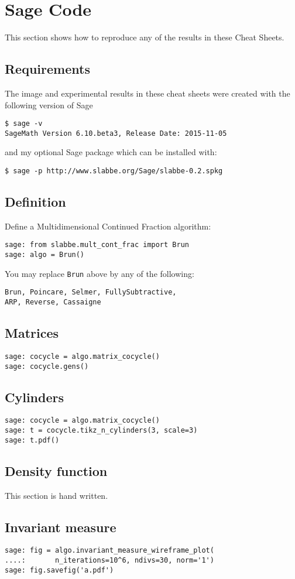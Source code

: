 \section{Sage Code}
This section shows how to reproduce any of the results in these Cheat Sheets.
\subsection{Requirements}
The image and experimental results in these cheat sheets were created with the
following version of Sage \cite{sage}
\begin{verbatim}
$ sage -v
SageMath Version 6.10.beta3, Release Date: 2015-11-05
\end{verbatim}
and my optional Sage package which can be installed with:
\begin{verbatim}
$ sage -p http://www.slabbe.org/Sage/slabbe-0.2.spkg
\end{verbatim}
\subsection{Definition}
Define a Multidimensional Continued Fraction algorithm:
\begin{verbatim}
sage: from slabbe.mult_cont_frac import Brun
sage: algo = Brun()
\end{verbatim}
You may replace \texttt{Brun} above by any of the following:
\begin{verbatim}
Brun, Poincare, Selmer, FullySubtractive, 
ARP, Reverse, Cassaigne
\end{verbatim}
\subsection{Matrices}
\begin{verbatim}
sage: cocycle = algo.matrix_cocycle()
sage: cocycle.gens()
\end{verbatim}
\subsection{Cylinders}
\begin{verbatim}
sage: cocycle = algo.matrix_cocycle()
sage: t = cocycle.tikz_n_cylinders(3, scale=3)
sage: t.pdf()
\end{verbatim}
\subsection{Density function}
This section is hand written.
\subsection{Invariant measure}
\begin{verbatim}
sage: fig = algo.invariant_measure_wireframe_plot(
....:       n_iterations=10^6, ndivs=30, norm='1')
sage: fig.savefig('a.pdf')
\end{verbatim}
